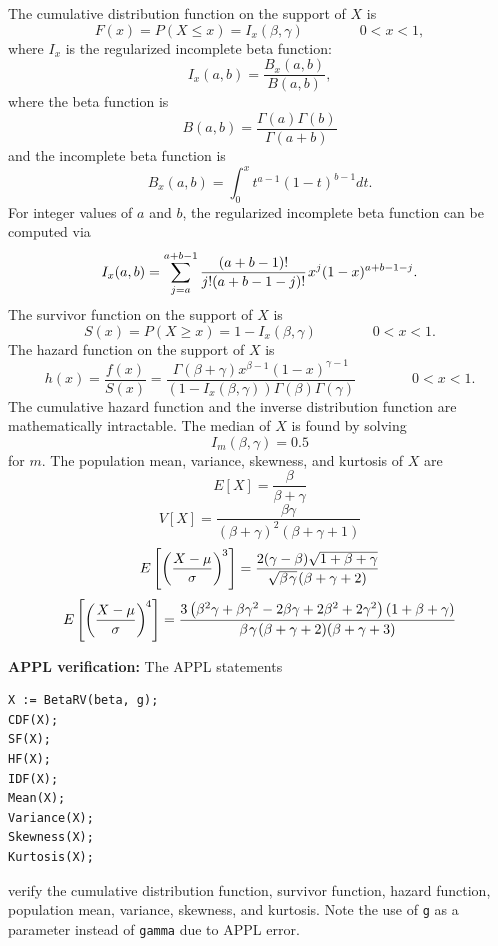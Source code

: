 \documentclass[12pt,fullpage]{article}
\begin{document}
The cumulative distribution function on
the support of $X$ is
$$
F(x) = P(X \le x) = I_{x} (\beta, \gamma) \qquad \qquad 0<x<1,
$$
where $I_x$ is the regularized incomplete beta function:
$$
I_{x} (a,b) = \frac{B_x(a, b)}{B(a, b)},
$$
where the beta function is
$$
B(a, b) = \frac{\Gamma(a) \Gamma(b)}{\Gamma(a + b)}
$$
and the incomplete beta function is
$$
B_x(a, b) = \int_0^x t ^ {a - 1} (1 - t) ^ {b - 1} dt.
$$
For integer values of $a$ and $b$, the regularized incomplete beta function can be
computed via
$$
I_{x} (a,b) = \sum_{j = a} ^ {a + b - 1} \frac{(a + b - 1) ! }{j ! (a + b - 1 - j) ! }
\kern 0.08 em x ^ {j}(1 - x) ^ {a + b - 1 - j}.
$$
The survivor function on the support of $X$ is
$$
S(x) = P(X \ge x) = 1- I_{x} (\beta, \gamma) \qquad \qquad 0<x<1.
$$
The hazard function on the support of $X$ is
$$
h(x) = \frac{f(x)}{S(x)} = \frac{\Gamma(\beta + \gamma) x ^ {\beta - 1}(1 - x) ^ {\gamma - 1}}{(1 - I_{x} (\beta, \gamma)) \Gamma(\beta) \Gamma(\gamma)} \qquad \qquad 0<x<1.
$$
The cumulative hazard function and the inverse distribution function are mathematically intractable.
The median of $X$ is found by solving 
$$
I_m(\beta, \gamma) = 0.5
$$
for $m$.
The population mean, variance, skewness, and kurtosis of $X$ are
$$
E[X] = \frac{\beta} {\beta + \gamma} 
$$
$$
V[X] = \frac{\beta \gamma}{(\beta + \gamma) ^ {2} (\beta + \gamma + 1)} 
$$
$$
E\left[ \left( \frac{X - \mu}{\sigma} \right) ^ {\kern -0.08 em 3} \right] =\frac{2(\gamma-\beta)\sqrt{1+\beta + \gamma}}{\sqrt{\beta \kern 0.08 em \gamma}\kern 0.08 em (\beta+\gamma+2)}
$$
$$
E\left[ \left( \frac{X - \mu}{\sigma} \right) ^ {\kern -0.08 em 4} \right] =  
\frac {3 \left( \beta^2 \gamma + \beta \gamma ^ 2 - 2 \beta \gamma + 2 \beta ^ 2 + 2 \gamma ^ 2  \right) \left( 1+ \beta + \gamma \right) }
{\beta \kern 0.08 em \gamma \kern 0.08 em (\beta+\gamma+2)(\beta+\gamma+3)}
$$

\newpage

\vspace{0.1in}
\noindent
{\bf APPL verification:}
The APPL statements
\begin{verbatim}
X := BetaRV(beta, g);
CDF(X);
SF(X);
HF(X);
IDF(X);
Mean(X);
Variance(X);
Skewness(X);
Kurtosis(X);
\end{verbatim}
verify the cumulative distribution function, survivor function, hazard function,
population mean, variance, skewness, and kurtosis.
Note the use of {\tt g} as a parameter instead of {\tt gamma} due to APPL error.
\end{document}
